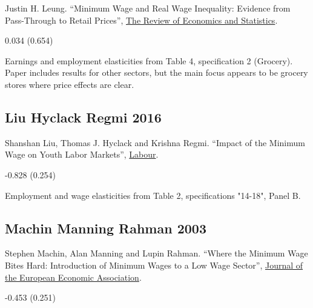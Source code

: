 \noindent Justin H. Leung. ``Minimum Wage and Real Wage Inequality: Evidence from Pass-Through to Retail Prices'', \href{https://doi.org/10.1162/rest_a_00915}{The Review of Economics and Statistics}.

\vspace{0.7em}

 0.034 (0.654)

\vspace{0.7em}

 Earnings and employment elasticities from Table 4, specification 2 (Grocery). Paper includes results for other sectors, but the main focus appears to be grocery stores where price effects are clear.

\subsection*{Liu Hyclack Regmi 2016}
\vspace{-0.7em}

\noindent Shanshan Liu, Thomas J. Hyclack and Krishna Regmi. ``Impact of the Minimum Wage on Youth Labor Markets'', \href{https://doi.org/10.1111/labr.12071}{Labour}.

\vspace{0.7em}

 -0.828 (0.254)

\vspace{0.7em}

 Employment and wage elasticities from Table 2, specifications "14-18", Panel B.

\subsection*{Machin Manning Rahman 2003}
\vspace{-0.7em}

\noindent Stephen Machin, Alan Manning and Lupin Rahman. ``Where the Minimum Wage Bites Hard: Introduction of Minimum Wages to a Low Wage Sector'', \href{https://doi.org/10.1162/154247603322256792}{Journal of the European Economic Association}.

\vspace{0.7em}

 -0.453 (0.251)

\vspace{0.7em}

